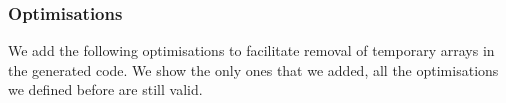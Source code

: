 \subsubsection{Optimisations}
We add the following optimisations to facilitate removal of temporary arrays in
the generated code.  We show the only ones that we added, all the optimisations
we defined before are still valid.
\begin{code}[hide]%
\>[0]\AgdaOperator{\AgdaFunction{\AgdaUnderscore{}/\AgdaUnderscore{}}}\AgdaSpace{}%
\AgdaSymbol{:}\AgdaSpace{}%
\AgdaSymbol{(}\AgdaSpace{}%
\AgdaSymbol{:}\AgdaSpace{}%
\AgdaSymbol{)}\AgdaSpace{}%
\AgdaSpace{}%
\AgdaSpace{}%
\AgdaSpace{}%
\AgdaSpace{}%
\AgdaSpace{}%
\<%
\\
\>[0]\AgdaSymbol{(}\AgdaSpace{}%
\AgdaSpace{}%
\AgdaSymbol{)}\AgdaSpace{}%
\AgdaOperator{\AgdaFunction{/}}\AgdaSpace{}%
\AgdaSpace{}%
\AgdaSymbol{=}\AgdaSpace{}%
\<%
\\
\>[0]\AgdaSymbol{(}\AgdaSpace{}%
\AgdaSpace{}%
\AgdaSymbol{)}\AgdaSpace{}%
\AgdaOperator{\AgdaFunction{/}}\AgdaSpace{}%
\AgdaSpace{}%
\AgdaSpace{}%
\AgdaSymbol{=}\AgdaSpace{}%
\AgdaSymbol{(}\AgdaSpace{}%
\AgdaOperator{\AgdaFunction{/}}\AgdaSpace{}%
\AgdaSymbol{)}\AgdaSpace{}%
\AgdaSpace{}%
\<%
\\
%
\\[\AgdaEmptyExtraSkip]%
\>[0]\<%
\\
\>[0]\<%
\\
\>[0]\<%
\\
\>[0]\<%
\\
\>[0][@{}l@{\AgdaIndent{0}}]%
\>[2]\AgdaSpace{}%
\AgdaSymbol{:}\AgdaSpace{}%
\AgdaSymbol{(}\AgdaSpace{}%
\AgdaSymbol{:}\AgdaSpace{}%
\AgdaSpace{}%
\AgdaSpace{}%
\AgdaSymbol{)}\AgdaSpace{}%
\AgdaSpace{}%
\AgdaSpace{}%

\end{code}
